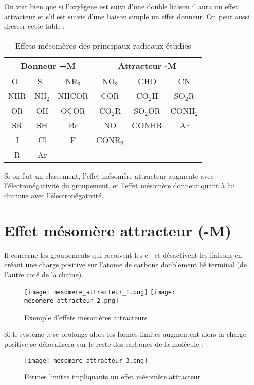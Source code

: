 \documentclass[a4paper, oneside]{book}
\begin{document}
On voit bien que si l'oxyègene est suivi d'une double liaison il aura un effet attracteur et s'il est suivis d'une liaison simple un effet donneur. On peut aussi dresser cette table :
\begin{table}[!h]
    \centering
    \begin{tabular}{|c c c|c c c|}
        \hline
        \multicolumn{3}{|c|}{Donneur +M} & \multicolumn{3}{c|}{Attracteur -M} \\
        \hline
        O$^-$ & S$^-$ & NR$_2$ & NO$_2$ & CHO & CN \\
        NHR & NH$_2$ & NHCOR & COR & CO$_2$H & SO$_2$R \\
        OR & OH & OCOR & CO$_2$R & SO$_2$OR & CONH$_2$\\
        SR & SH & Br & NO & CONHR & Ar\\
        I & Cl & F & CONR$_2$ & & \\
        R & Ar & & & & \\
        \hline
    \end{tabular}
    \caption{Effets mésomères des principaux radicaux étudiés}
    \label{tab:my_label}
\end{table}

Si on fait un classement, l'effet mésomère attracteur augmente avec l'électronégativité du groupement, et l'effet mésomère donneur quant à lui diminue avec l'électronégativité.
\section{Effet mésomère attracteur (-M)}
Il concerne les groupements qui recoivent les e$^-$ et désactivent les liaisons en créant une charge positive sur l'atome de carbone doublement lié terminal (de l'autre coté de la chaîne).
\begin{figure}[!h]
    \centering
    \texttt{[image: mesomere\_attracteur\_1.png]}
    \texttt{[image: mesomere\_attracteur\_2.png]}
    \caption{Exemple d'effets mésomères attracteurs}
    \label{fig:my_label}
\end{figure}

Si le système $\pi$ se prolonge alors les formes limites augmentent alors la charge positive se délocalisera sur le reste des carbones de la molécule :
\begin{figure}[!h]
    \centering
    \texttt{[image: mesomere\_attracteur\_3.png]}
    \caption{Formes limites impliquants un effet mésomère attracteur}
    \label{fig:my_label}
\end{figure}
\end{document}
